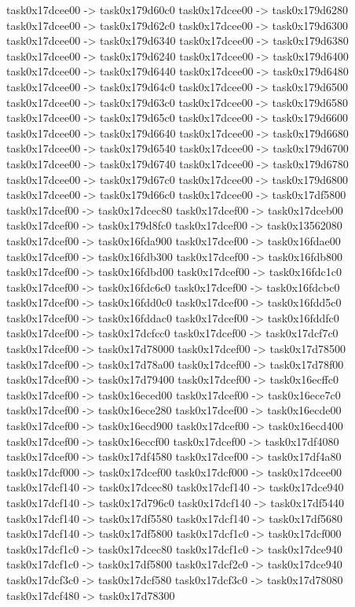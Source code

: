 {	task0x17dcee00 -> task0x179d60c0
	task0x17dcee00 -> task0x179d6280
	task0x17dcee00 -> task0x179d62c0
	task0x17dcee00 -> task0x179d6300
	task0x17dcee00 -> task0x179d6340
	task0x17dcee00 -> task0x179d6380
	task0x17dcee00 -> task0x179d6240
	task0x17dcee00 -> task0x179d6400
	task0x17dcee00 -> task0x179d6440
	task0x17dcee00 -> task0x179d6480
	task0x17dcee00 -> task0x179d64c0
	task0x17dcee00 -> task0x179d6500
	task0x17dcee00 -> task0x179d63c0
	task0x17dcee00 -> task0x179d6580
	task0x17dcee00 -> task0x179d65c0
	task0x17dcee00 -> task0x179d6600
	task0x17dcee00 -> task0x179d6640
	task0x17dcee00 -> task0x179d6680
	task0x17dcee00 -> task0x179d6540
	task0x17dcee00 -> task0x179d6700
	task0x17dcee00 -> task0x179d6740
	task0x17dcee00 -> task0x179d6780
	task0x17dcee00 -> task0x179d67c0
	task0x17dcee00 -> task0x179d6800
	task0x17dcee00 -> task0x179d66c0
	task0x17dcee00 -> task0x17df5800
	task0x17dcef00 -> task0x17dcec80
	task0x17dcef00 -> task0x17dceb00
	task0x17dcef00 -> task0x179d8fc0
	task0x17dcef00 -> task0x13562080
	task0x17dcef00 -> task0x16fda900
	task0x17dcef00 -> task0x16fdae00
	task0x17dcef00 -> task0x16fdb300
	task0x17dcef00 -> task0x16fdb800
	task0x17dcef00 -> task0x16fdbd00
	task0x17dcef00 -> task0x16fdc1c0
	task0x17dcef00 -> task0x16fdc6c0
	task0x17dcef00 -> task0x16fdcbc0
	task0x17dcef00 -> task0x16fdd0c0
	task0x17dcef00 -> task0x16fdd5c0
	task0x17dcef00 -> task0x16fddac0
	task0x17dcef00 -> task0x16fddfc0
	task0x17dcef00 -> task0x17dcfcc0
	task0x17dcef00 -> task0x17dcf7c0
	task0x17dcef00 -> task0x17d78000
	task0x17dcef00 -> task0x17d78500
	task0x17dcef00 -> task0x17d78a00
	task0x17dcef00 -> task0x17d78f00
	task0x17dcef00 -> task0x17d79400
	task0x17dcef00 -> task0x16ecffc0
	task0x17dcef00 -> task0x16eced00
	task0x17dcef00 -> task0x16ece7c0
	task0x17dcef00 -> task0x16ece280
	task0x17dcef00 -> task0x16ecde00
	task0x17dcef00 -> task0x16ecd900
	task0x17dcef00 -> task0x16ecd400
	task0x17dcef00 -> task0x16eccf00
	task0x17dcef00 -> task0x17df4080
	task0x17dcef00 -> task0x17df4580
	task0x17dcef00 -> task0x17df4a80
	task0x17dcf000 -> task0x17dcef00
	task0x17dcf000 -> task0x17dcee00
	task0x17dcf140 -> task0x17dcec80
	task0x17dcf140 -> task0x17dce940
	task0x17dcf140 -> task0x17d796c0
	task0x17dcf140 -> task0x17df5440
	task0x17dcf140 -> task0x17df5580
	task0x17dcf140 -> task0x17df5680
	task0x17dcf140 -> task0x17df5800
	task0x17dcf1c0 -> task0x17dcf000
	task0x17dcf1c0 -> task0x17dcec80
	task0x17dcf1c0 -> task0x17dce940
	task0x17dcf1c0 -> task0x17df5800
	task0x17dcf2c0 -> task0x17dce940
	task0x17dcf3c0 -> task0x17dcf580
	task0x17dcf3c0 -> task0x17d78080
	task0x17dcf480 -> task0x17d78300
}
